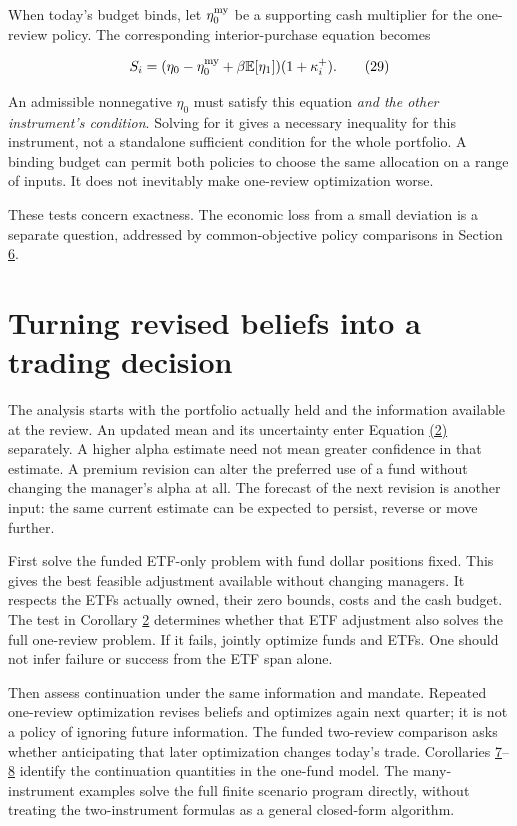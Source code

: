 \documentclass[11pt]{article}
\begin{document}
When today's budget binds, let \(\eta_0^{\rm my}\) be a supporting cash multiplier for the one-review policy. The corresponding interior-purchase equation becomes

\begin{equation*}
S_i=(\eta_0-\eta_0^{\rm my}+\beta\mathbb E[\eta_1])(1+\kappa_i^+).
\tag{29}\label{eq:29}
\end{equation*}

An admissible nonnegative \(\eta_0\) must satisfy this equation \emph{and the other instrument's condition}. Solving for it gives a necessary inequality for this instrument, not a standalone sufficient condition for the whole portfolio. A binding budget can permit both policies to choose the same allocation on a range of inputs. It does not inevitably make one-review optimization worse.

These tests concern exactness. The economic loss from a small deviation is a separate question, addressed by common-objective policy comparisons in Section \hyperref[sec:6]{6}.

\section{Turning revised beliefs into a trading decision}\label{sec:5}

The analysis starts with the portfolio actually held and the information available at the review. An updated mean and its uncertainty enter Equation \hyperref[eq:2]{(2)} separately. A higher alpha estimate need not mean greater confidence in that estimate. A premium revision can alter the preferred use of a fund without changing the manager's alpha at all. The forecast of the next revision is another input: the same current estimate can be expected to persist, reverse or move further.

First solve the funded ETF-only problem with fund dollar positions fixed. This gives the best feasible adjustment available without changing managers. It respects the ETFs actually owned, their zero bounds, costs and the cash budget. The test in Corollary \hyperref[res:Corollary-2]{2} determines whether that ETF adjustment also solves the full one-review problem. If it fails, jointly optimize funds and ETFs. One should not infer failure or success from the ETF span alone.

Then assess continuation under the same information and mandate. Repeated one-review optimization revises beliefs and optimizes again next quarter; it is not a policy of ignoring future information. The funded two-review comparison asks whether anticipating that later optimization changes today's trade. Corollaries \hyperref[res:Corollary-7]{7}--\hyperref[res:Corollary-8]{8} identify the continuation quantities in the one-fund model. The many-instrument examples solve the full finite scenario program directly, without treating the two-instrument formulas as a general closed-form algorithm.
\end{document}
